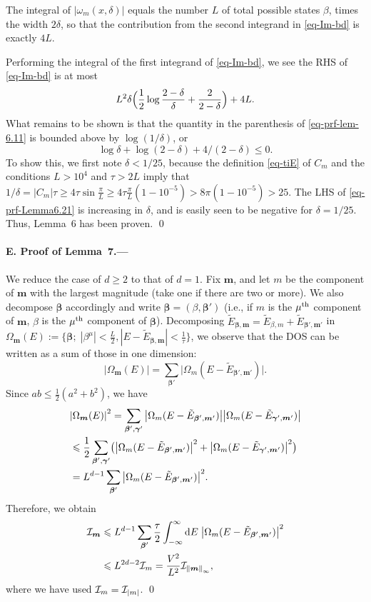 \documentclass[aps,prl,superscriptaddress,reprint]{revtex4-2}
\newcommand{\se}[1]{\paragraph{#1.---}}
\newcommand*{\dd}{\mathop{}\!\mathrm{d}}
\theoremstyle{definition}
\newcommand{\abs}[1]{{\left\vert #1 \right\vert}}
\newcommand{\nabs}[1]{{| #1 |}}
\newcommand{\bigabs}[1]{{\bigl | #1 \bigr |}}
\newcommand{\bigparen}[1]{\bigl({#1}\bigr)}
\newcommand{\bigbrac}[1]{\bigl\{{#1}\bigr\}}
\newcommand{\nn}{\notag \\ }
\newcommand{\II}{{\cal I}}
\newcommand{\ti}{\tilde}
\newcommand{\ta}{\tau}
\renewcommand{\b}{\beta}
\renewcommand{\c}{\gamma}
\renewcommand{\d}{\delta}
\newcommand{\m}{\mu}
\newcommand{\om}{\omega}
\newcommand{\Om}{\Omega}
\newcommand{\f}{\frac}
\newcommand{\ve}[1]{\boldsymbol{#1}}
\newcommand{\norm}[1]{\left\|#1\right\|}
\renewcommand{\ge}{\geqslant}
\renewcommand{\le}{\leqslant}
\renewcommand{\leq}{\leqslant}
\newcommand{\intinf}{\int_{-\infty}^\infty}
\newcommand{\bb}{{\ve \b}}
\newcommand{\cc}{{\ve \c}}
\newcommand{\mm}{{\ve m}}
\begin{document}
The integral of $\abs{\om_m(x,\d)}$
equals the number $L$ of total possible states $\b$,
times the width $2\d$,
so that the contribution from the second integrand
in \eqref{eq-Im-bd} is exactly
$4L$.




Performing the integral of the first integrand of \eqref{eq-Im-bd},
we see the RHS of \eqref{eq-Im-bd}
is at most
\begin{align}
    {L^2 \delta}
    \Bigl (
    \frac{1}{2} \log\f{2-\d}{\d}
    + \frac{2}{2-\delta}
    \Bigr )
    +
    4L.
    \label{eq-prf-lem-6.11}
\end{align}
What remains to be shown is that the quantity in the parenthesis of
\eqref{eq-prf-lem-6.11} is bounded above by $\log(1/\delta)$,
or
\begin{equation}
	\log \delta + \log(2-\delta) + 4/(2-\delta) \leq 0 .
	\label{eq-prf-Lemma6.21}
\end{equation}
To show this,
we first note $\delta < 1/25$,
because
the definition \eqref{eq-tiE}
of $C_m$ and the conditions $L>10^4$ and $\ta>2L$
imply that
$1/\d =\abs{C_m}\ta\ge 4\ta\sin\f\pi L
\ge 4\ta\f\pi L(1-10^{-5})>8\pi(1-10^{-5})>25$.
The LHS of \eqref{eq-prf-Lemma6.21} is increasing in $\delta$,
and is easily seen to be negative for $\delta = 1/25$.
Thus, Lemma~6 has been proven.
\qed


\medskip

\se{E. Proof of Lemma~7}


We reduce the case of $d\ge2$ to that of
$d=1$.
Fix $\mm$, and let $m$ be the component of $\mm$ with the largest magnitude
(take one if there are two or more).
We also decompose $\bb$ accordingly and write $\bb = (\b,\bb')$
(i.e., if $m$ is the $\m^{\rm th}$ component of $\mm$, $\b$ is the
 $\m^{\rm th}$
component of $\bb$).
Decomposing $\ti E_{\bb,\mm}=\ti E_{\b,m}+\ti E_{\bb',\mm'}$ in
$
\Om_{\mm}(E):=\bigbrac{\bb; \;
  \abs{\b^\m}<\f L2,
  \nabs{ E-\ti E_{\bb,\mm} }<\f1\ta}
$, we observe that the DOS can be written as a sum of those
in one dimension:
\begin{equation}
  \abs{ \Om_\mm(E) }
  =
  \sum_{\bb'}
  \bigabs{ \Om_m(E-\ti E_{\bb',\mm'}) }
  .
\end{equation}
Since $ab\le \f12(a^2+b^2)$, we have
\begin{align}
  &\abs{ \Om_\mm(E) }^2
  =
  \sum_{\bb',\cc'}
  \bigabs{ \Om_m(E-\ti E_{\bb',\mm'}) }
  \bigabs{ \Om_m(E-\ti E_{\cc',\mm'}) }
  \nn
  &\le
    \f12
    \sum_{\bb',\cc'}
    \bigparen{
  \bigabs{ \Om_m(E-\ti E_{\bb',\mm'}) }^2+
    \bigabs{ \Om_m(E-\ti E_{\cc',\mm'}) }^2
    }
  \nn
  &=
    {L^{d-1}}
    \sum_{\bb'}
  \bigabs{ \Om_m(E-\ti E_{\bb',\mm'}) }^2.
\end{align}
Therefore, we
obtain
\begin{align}
  \II_\mm
  &\le
    {L^{d-1}}
    \sum_{\bb'}
    \f\ta2
    \intinf \dd E\;
    \bigabs{ \Om_m(E-\ti E_{\bb',\mm'}) }^2
    \nn
    &\le
    L^{2d-2}\II_m
    =
    \f{V^2}{L^2}
      \II_{\norm \mm_\infty},
      \label{eq-Imm-bd}
\end{align}
where we have used $\II_m=\II_{\abs m}$.
\qed
\end{document}
